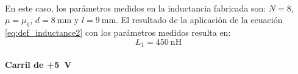 \paragraph{}
En este caso, los par\'ametros medidos en la inductancia fabricada son: $N = 8$, $\mu = \mu_0$, $d = \SI{8}{\milli\metre}$ y $l = \SI{9}{\milli\metre}$. El resultado de la aplicaci\'on de la ecuaci\'on \ref{eq:def_inductance2} con los par\'ametros medidos resulta en: $$L_1 = \SI{450}{\nano\henry}$$


\paragraph{}
\paragraph{Carril de +\SI{5}{\volt}}
